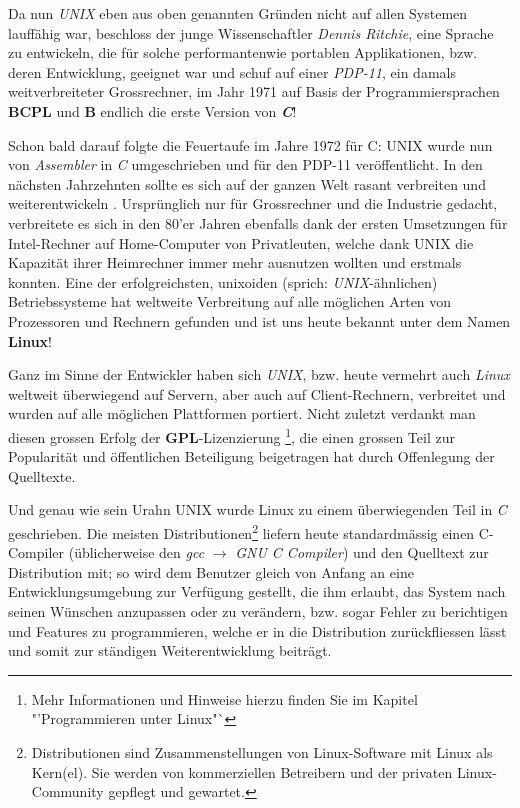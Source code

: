 \documentclass[b5paper,10pt,dvips,fleqn,titlepage,twoside]{book}
\begin{document}
Da nun \emph{UNIX} eben aus oben genannten Gründen nicht auf allen Systemen lauffähig war, beschloss der junge Wissenschaftler \emph{Dennis Ritchie}, eine Sprache zu entwickeln, die für solche performantenwie portablen Applikationen, bzw. deren Entwicklung, geeignet war und schuf auf einer \emph{PDP-11}, ein damals weitverbreiteter Grossrechner, im Jahr 1971 auf Basis der Programmiersprachen \textbf{BCPL} und \textbf{B} endlich die erste Version von \emph{\textbf{C}}!

Schon bald darauf folgte die Feuertaufe im Jahre 1972 für C: UNIX wurde nun von \emph{Assembler} in \emph{C} umgeschrieben und für den PDP-11 veröffentlicht.\newline
In den nächsten Jahrzehnten sollte es sich auf der ganzen Welt rasant verbreiten und weiterentwickeln . Ursprünglich nur für Grossrechner und die Industrie gedacht, verbreitete es sich in den 80'er Jahren ebenfalls dank der ersten Umsetzungen für Intel-Rechner auf Home-Computer von Privatleuten, welche dank UNIX die Kapazität ihrer Heimrechner immer mehr ausnutzen wollten und erstmals konnten. Eine der erfolgreichsten, unixoiden (sprich: \emph{UNIX}-ähnlichen) Betriebssysteme hat weltweite Verbreitung auf alle möglichen Arten von Prozessoren und Rechnern gefunden und ist uns heute bekannt unter dem Namen \textbf{Linux}!

Ganz im Sinne der Entwickler haben sich \emph{UNIX}, bzw. heute vermehrt auch \emph{Linux} weltweit überwiegend auf Servern, aber auch auf Client-Rechnern, verbreitet und wurden auf alle möglichen Plattformen portiert. Nicht zuletzt verdankt man diesen grossen Erfolg  der \textbf{GPL}-Lizenzierung \footnote{Mehr Informationen und Hinweise hierzu finden Sie im Kapitel "'Programmieren unter Linux"`}, die einen grossen Teil zur Popularität und öffentlichen Beteiligung beigetragen hat durch Offenlegung der Quelltexte.

Und genau wie sein Urahn UNIX wurde Linux zu einem überwiegenden Teil in \emph{C} geschrieben.
Die meisten Distributionen\footnote{Distributionen sind Zusammenstellungen von Linux-Software mit Linux als Kern(el). Sie werden von kommerziellen Betreibern und der privaten Linux-Community gepflegt und gewartet.} liefern heute standardmässig einen C-Compiler (üblicherweise den \emph{gcc} $\rightarrow$ \emph{GNU C Compiler}) und den Quelltext zur Distribution mit; so wird dem Benutzer gleich von Anfang an eine Entwicklungsumgebung zur Verfügung gestellt, die ihm erlaubt, das System nach seinen Wünschen anzupassen oder zu verändern, bzw. sogar Fehler zu berichtigen und Features zu programmieren, welche er in die Distribution zurückfliessen lässt und somit zur ständigen Weiterentwicklung beiträgt.
\end{document}

